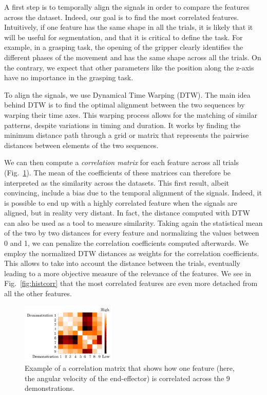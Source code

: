 \documentclass[conference]{IEEEtran}
\begin{document}
A first step is to temporally align the signals in order to compare the features across the dataset. Indeed, our goal is to find the most correlated features. Intuitively, if one feature has the same shape in all the trials, it is likely that it will be useful for segmentation, and that it is critical to define the task. For example, in a grasping task, the opening of the gripper clearly identifies the different phases of the movement and has the same shape across all the trials. On the contrary, we expect that other parameters like the position along the z-axis have no importance in the grasping task.

To align the signals, we use Dynamical Time Warping (DTW). The main idea behind DTW is to find the optimal alignment between the two sequences by warping their time axes. This warping process allows for the matching of similar patterns, despite variations in timing and duration. It works by finding the minimum distance path through a grid or matrix that represents the pairwise distances between elements of the two sequences. \newline


We can then compute a \textit{correlation matrix} for each feature across all trials (Fig.~\ref{fig:corrMat}). The mean of the coefficients of these matrices can therefore be interpreted as the similarity across the datasets. This first result, albeit convincing, include a bias due to the temporal alignment of the signals. Indeed, it is possible to end up with a highly correlated feature when the signals are aligned, but in reality very distant. In fact, the distance computed with DTW can also be used as a tool to measure similarity. Taking again the statistical mean of the two by two distances for every feature and normalizing the values between 0 and 1, we can penalize the correlation coefficients computed afterwards. We employ the normalized DTW distances as weights for the correlation coefficients. This allows to take into account the distance between the trials, eventually leading to a more objective measure of the relevance of the features. We see in Fig.~\ref{fig:histcorr} that the most correlated features are even more detached from all the other features.  

\begin{figure}[t]
  \centering
  \includegraphics[width=0.4\textwidth]{img/resolCorrMap.pdf}
  \caption{Example of a correlation matrix that shows how one feature (here, the angular velocity of the end-effector) is correlated across the 9 demonstrations.}
  \label{fig:corrMat}
\end{figure}
\end{document}

